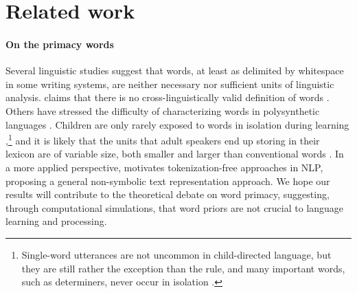 \section{Related work}
\label{sec:related}

\paragraph{On the primacy words} Several linguistic studies suggest
that words, at least as delimited by whitespace in some writing
systems, are neither necessary nor sufficient units of linguistic
analysis.  claims that there is no
cross-linguistically valid definition of words \cite[see also][who
address specifically the notion of prosodic
word]{Schiering:etal:2010}. Others have stressed the difficulty of
characterizing words in polysynthetic languages
\cite{Bickel:Zuniga:2017}. Children are only rarely exposed to words
in isolation during learning
\cite{Tomasello:2003},\footnote{Single-word utterances are not
  uncommon in child-directed language, but they are still rather the
  exception than the rule, and many important words, such as
  determiners, never occur in isolation
  \cite{Christiansen:etal:2005}.} and it is likely that the units that
adult speakers end up storing in their lexicon are of variable size,
both smaller and larger than conventional words
\cite[e.g.,][]{Jackendoff:2002,Goldberg:2005}. In a more applied
perspective,  motivates tokenization-free
approaches in NLP, proposing a general non-symbolic text
representation approach. %
We hope our results will contribute to the theoretical
debate on word primacy, suggesting, through computational simulations, that
word priors are not crucial to language learning and processing.


